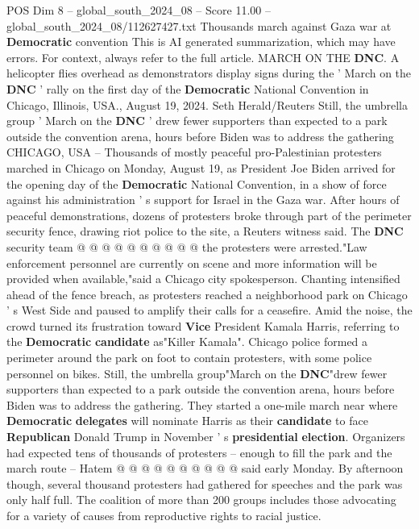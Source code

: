 \begin{textsample}{POS Dim 8 – global\_south\_2024\_08 – Score 11.00 – global\_south\_2024\_08/112627427.txt}  \label{ex:f8_pos_174}
Thousands march against Gaza war at \textbf{Democratic} convention This is AI generated summarization, which may have errors.
For context, always refer to the full article.
MARCH ON THE \textbf{DNC}.
A helicopter flies overhead as demonstrators display signs during the ' March on the \textbf{DNC} ' rally on the first day of the \textbf{Democratic} National Convention in Chicago, Illinois, USA., August 19, 2024.
Seth Herald/Reuters Still, the umbrella group ' March on the \textbf{DNC} ' drew fewer supporters than expected to a park outside the convention arena, hours before Biden was to address the gathering CHICAGO, USA -- Thousands of mostly peaceful pro-Palestinian protesters marched in Chicago on Monday, August 19, as President Joe Biden arrived for the opening day of the \textbf{Democratic} National Convention, in a show of force against his administration ' s support for Israel in the Gaza war.
After hours of peaceful demonstrations, dozens of protesters broke through part of the perimeter security fence, drawing riot police to the site, a Reuters witness said.
The \textbf{DNC} security team @ @ @ @ @ @ @ @ @ @ the protesters were arrested."Law enforcement personnel are currently on scene and more information will be provided when available,"said a Chicago city spokesperson.
Chanting intensified ahead of the fence breach, as protesters reached a neighborhood park on Chicago ' s West Side and paused to amplify their calls for a ceasefire.
Amid the noise, the crowd turned its frustration toward \textbf{Vice} President Kamala Harris, referring to the \textbf{Democratic} \textbf{candidate} as"Killer Kamala".
Chicago police formed a perimeter around the park on foot to contain protesters, with some police personnel on bikes.
Still, the umbrella group"March on the \textbf{DNC}"drew fewer supporters than expected to a park outside the convention arena, hours before Biden was to address the gathering.
They started a one-mile march near where \textbf{Democratic} \textbf{delegates} will nominate Harris as their \textbf{candidate} to face \textbf{Republican} Donald Trump in November ' s \textbf{presidential} \textbf{election}.
Organizers had expected tens of thousands of protesters -- enough to fill the park and the march route -- Hatem @ @ @ @ @ @ @ @ @ @ said early Monday.
By afternoon though, several thousand protesters had gathered for speeches and the park was only half full.
The coalition of more than 200 groups includes those advocating for a variety of causes from reproductive rights to racial justice.

\end{textsample}
